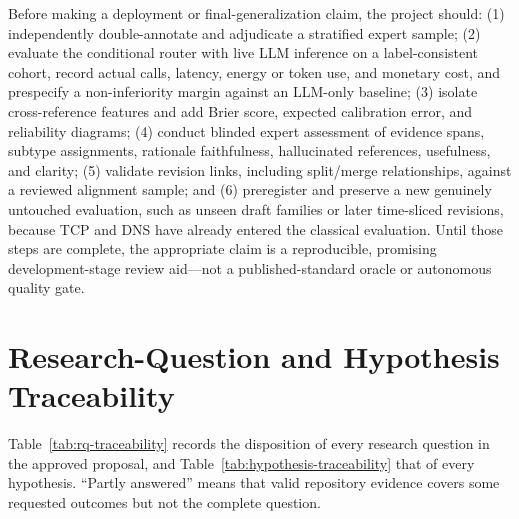 \documentclass[12pt,a4paper,oneside]{report}
\begin{document}
Before making a deployment or final-generalization claim, the project should: (1) independently double-annotate and adjudicate a stratified expert sample; (2) evaluate the conditional router with live LLM inference on a label-consistent cohort, record actual calls, latency, energy or token use, and monetary cost, and prespecify a non-inferiority margin against an LLM-only baseline; (3) isolate cross-reference features and add Brier score, expected calibration error, and reliability diagrams; (4) conduct blinded expert assessment of evidence spans, subtype assignments, rationale faithfulness, hallucinated references, usefulness, and clarity; (5) validate revision links, including split/merge relationships, against a reviewed alignment sample; and (6) preregister and preserve a new genuinely untouched evaluation, such as unseen draft families or later time-sliced revisions, because TCP and DNS have already entered the classical evaluation. Until those steps are complete, the appropriate claim is a reproducible, promising development-stage review aid---not a published-standard oracle or autonomous quality gate.


\clearpage
{}


\appendix

\chapter{Research-Question and Hypothesis Traceability}

Table~\ref{tab:rq-traceability} records the disposition of every research question in the approved proposal, and Table~\ref{tab:hypothesis-traceability} that of every hypothesis. ``Partly answered'' means that valid repository evidence covers some requested outcomes but not the complete question.
\end{document}
